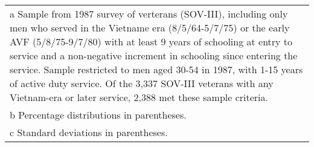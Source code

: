 \documentclass{article}
\begin{document}
\begin{table}[]
\begin{tabular}{lcclcc}
\multicolumn{6}{l}{a Sample from 1987 survey of verterans (SOV-III), including only men who served in the Vietname era (8/5/64-5/7/75) or the early AVF (5/8/75-9/7/80) with at least 9 years of schooling at entry to service and a non-negative increment in schooling since entering the service. Sample restricted to men aged 30-54 in 1987, with 1-15 years of active duty service. Of the 3,337 SOV-III veterans with any Vietnam-era or later service, 2,388 met these sample criteria.} \\
\multicolumn{6}{l}{b Percentage distributions in parentheses.}                                                                                                                                                                                                                                                                                                                                                                                                                                   \\
\multicolumn{6}{l}{c Standard deviations in parentheses.}                                                                                                                                                                                                                                                                                                                                                                                                                                       
\end{tabular}
\end{table}
\end{document}
